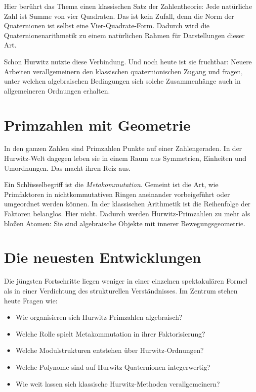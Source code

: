 \documentclass[11pt,a4paper]{article}
\begin{document}
	Hier berührt das Thema einen klassischen Satz der Zahlentheorie: Jede natürliche Zahl ist Summe von vier Quadraten. Das ist kein Zufall, denn die Norm der Quaternionen ist selbst eine Vier-Quadrate-Form. Dadurch wird die Quaternionenarithmetik zu einem natürlichen Rahmen für Darstellungen dieser Art.
	
	Schon Hurwitz nutzte diese Verbindung. Und noch heute ist sie fruchtbar: Neuere Arbeiten verallgemeinern den klassischen quaternionischen Zugang und fragen, unter welchen algebraischen Bedingungen sich solche Zusammenhänge auch in allgemeineren Ordnungen erhalten.
	
	\section*{Primzahlen mit Geometrie}
	
	In den ganzen Zahlen sind Primzahlen Punkte auf einer Zahlengeraden. In der Hurwitz-Welt dagegen leben sie in einem Raum aus Symmetrien, Einheiten und Umordnungen. Das macht ihren Reiz aus.
	
	Ein Schlüsselbegriff ist die \emph{Metakommutation}. Gemeint ist die Art, wie Primfaktoren in nichtkommutativen Ringen aneinander vorbeigeführt oder umgeordnet werden können. In der klassischen Arithmetik ist die Reihenfolge der Faktoren belanglos. Hier nicht. Dadurch werden Hurwitz-Primzahlen zu mehr als bloßen Atomen: Sie sind algebraische Objekte mit innerer Bewegungsgeometrie.
	
	\section*{Die neuesten Entwicklungen}
	
	Die jüngsten Fortschritte liegen weniger in einer einzelnen spektakulären Formel als in einer Verdichtung des strukturellen Verständnisses. Im Zentrum stehen heute Fragen wie:
	
	\begin{itemize}[leftmargin=1.5em]
		\item Wie organisieren sich Hurwitz-Primzahlen algebraisch?
		\item Welche Rolle spielt Metakommutation in ihrer Faktorisierung?
		\item Welche Modulstrukturen entstehen über Hurwitz-Ordnungen?
		\item Welche Polynome sind auf Hurwitz-Quaternionen integerwertig?
		\item Wie weit lassen sich klassische Hurwitz-Methoden verallgemeinern?
	\end{itemize}
	
\end{document}
